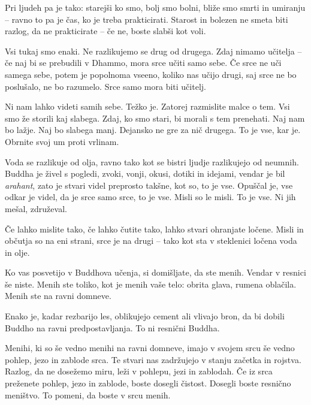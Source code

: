 Pri ljudeh pa je tako: starejši ko smo, bolj smo bolni, bliže smo smrti in umiranju – ravno to pa je čas, ko je treba prakticirati. Starost in bolezen ne smeta biti razlog, da ne prakticirate – če ne, boste slabši kot voli.

\clearpage


Vsi tukaj smo enaki. Ne razlikujemo se drug od drugega. Zdaj nimamo učitelja – če naj bi se prebudili v Dhammo, mora srce učiti samo sebe. Če srce ne uči samega sebe, potem je popolnoma vseeno, koliko nas učijo drugi, saj srce ne bo poslušalo, ne bo razumelo. Srce samo mora biti učitelj.

Ni nam lahko videti samih sebe. Težko je. Zatorej razmislite malce o tem. Vsi smo že storili kaj slabega. Zdaj, ko smo stari, bi morali s tem prenehati. Naj nam bo lažje. Naj bo slabega manj. Dejansko ne gre za nič drugega. To je vse, kar je. Obrnite svoj um proti vrlinam.


Voda se razlikuje od olja, ravno tako kot se bistri ljudje razlikujejo od neumnih. Buddha je živel s pogledi, zvoki, vonji, okusi, dotiki in idejami, vendar je bil \emph{arahant}, zato je stvari videl preprosto takšne, kot so, to je vse. Opuščal je, vse odkar je videl, da je srce samo srce, to je vse. Misli so le misli. To je vse. Ni jih mešal, združeval.

Če lahko mislite tako, če lahko čutite tako, lahko stvari ohranjate ločene. Misli in občutja so na eni strani, srce je na drugi – tako kot sta v steklenici ločena voda in olje.

\clearpage


Ko vas posvetijo v Buddhova učenja, si domišljate, da ste menih. Vendar v resnici še niste. Menih ste toliko, kot je menih vaše telo: obrita glava, rumena oblačila. Menih ste na ravni domneve.

Enako je, kadar rezbarijo les, oblikujejo cement ali vlivajo bron, da bi dobili Buddho na ravni predpostavljanja. To ni resnični Buddha.

Menihi, ki so še vedno menihi na ravni domneve, imajo v svojem srcu še vedno pohlep, jezo in zablode srca. Te stvari nas zadržujejo v stanju začetka in rojstva. Razlog, da ne dosežemo miru, leži v pohlepu, jezi in zablodah. Če iz srca preženete pohlep, jezo in zablode, boste dosegli čistost. Dosegli boste resnično meništvo. To pomeni, da boste v srcu menih.

